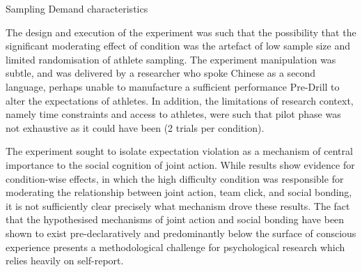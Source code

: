 
Sampling
Demand characteristics


The design and execution of the experiment was such that the possibility that the significant moderating effect of condition was the artefact of low sample size and limited randomisation of athlete sampling. The experiment manipulation was subtle, and was delivered by a researcher who spoke Chinese as a second language, perhaps unable to manufacture a sufficient performance Pre-Drill to alter the expectations of athletes. In addition, the limitations of research context, namely time constraints and access to athletes, were such that pilot phase was not exhaustive as it could have been (2 trials per condition).

The experiment sought to isolate expectation violation as a mechanism of central importance to the social cognition of joint action.  While results show evidence for condition-wise effects, in which the high difficulty condition was responsible for moderating the relationship between joint action, team click, and social bonding, it is not sufficiently clear precisely what mechanism drove these results.
The fact that the hypothesised mechanisms of joint action and social bonding have been shown to exist pre-declaratively and predominantly below the surface of conscious experience presents a methodological challenge for psychological research which relies heavily on self-report.



